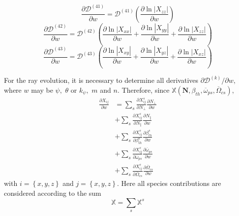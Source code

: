 \documentclass[a4paper,12pt]{article}%
\begin{document}
\begin{equation}
\frac{\partial\mathcal{D}^{\left(  41\right)  }}{\partial w}=\mathcal{D}%
^{\left(  41\right)  }\left(  \frac{\partial\ln\left\vert X_{zz}\right\vert
}{\partial w}\right)
\end{equation}%
\begin{equation}
\frac{\partial\mathcal{D}^{\left(  42\right)  }}{\partial w}=\mathcal{D}%
^{\left(  42\right)  }\left(  \frac{\partial\ln\left\vert X_{xx}\right\vert
}{\partial w}+\frac{\partial\ln\left\vert X_{yy}\right\vert }{\partial
w}+\frac{\partial\ln\left\vert X_{zz}\right\vert }{\partial w}\right)
\end{equation}%
\begin{equation}
\frac{\partial\mathcal{D}^{\left(  43\right)  }}{\partial w}=\mathcal{D}%
^{\left(  43\right)  }\left(  \frac{\partial\ln\left\vert X_{xy}\right\vert
}{\partial w}+\frac{\partial\ln\left\vert X_{yz}\right\vert }{\partial
w}+\frac{\partial\ln\left\vert X_{xz}\right\vert }{\partial w}\right)
\end{equation}


For the ray evolution, it is necessary to determine all derivatives
$\partial\mathcal{D}^{\left(  k\right)  }\mathcal{/\partial}w\mathcal{,}$
where $w$ may be $\psi,$ $\theta$ or $k_{\psi},$ $m$ and $n$. Therefore, since
$\mathbb{X}\left(  \mathbf{N},\beta_{th},\overline{\omega}_{ps},\overline
{\Omega}_{cs}\right)  ,$%
\begin{align}
\frac{\partial X_{ij}}{\mathcal{\partial}w}  &  =\sum_{s}\frac{\partial
X_{ij}^{s}}{\mathcal{\partial}N_{\bot}}\frac{\partial N_{\bot}}%
{\mathcal{\partial}w}\nonumber\\
&  +\sum_{s}\frac{\partial X_{ij}^{s}}{\mathcal{\partial}N_{\Vert}}%
\frac{\partial N_{\Vert}}{\mathcal{\partial}w}\nonumber\\
&  +\sum_{s}\frac{\partial X_{ij}^{s}}{\mathcal{\partial}\beta_{th}^{s}}%
\frac{\partial\beta_{th}^{s}}{\mathcal{\partial}w}\nonumber\\
&  +\sum_{s}\frac{\partial X_{ij}^{s}}{\mathcal{\partial}\overline{\omega
}_{ps}}\frac{\partial\overline{\omega}_{ps}}{\mathcal{\partial}w}\nonumber\\
&  +\sum_{s}\frac{\partial X_{ij}^{s}}{\mathcal{\partial}\overline{\Omega
}_{cs}}\frac{\partial\overline{\Omega}_{cs}}{\mathcal{\partial}w}%
\end{align}
with $i=\left\{  x,y,z\right\}  $ and $j=\left\{  x,y,z\right\}  $. Here all
species contributions are considered according to the sum
\begin{equation}
\mathbb{X}=\sum_{s}\mathbb{X}^{s}%
\end{equation}
\end{document}
